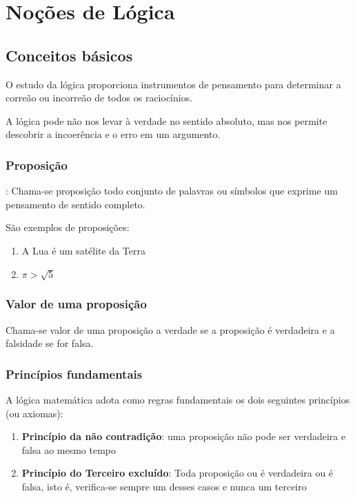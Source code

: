 \chapter{Noções de Lógica}

\section{Conceitos básicos}

\hspace{0,5cm}O estudo da lógica proporciona instrumentos de pensamento para determinar a correão ou incorreão de todos os raciocínios.

A lógica pode não nos levar à verdade no sentido absoluto, mas nos permite descobrir a incoerência e o erro em um argumento.

\subsection{Proposição}

\begin{definicao}[Proposição]: Chama-se proposição todo conjunto de palavras ou símbolos que exprime um pensamento de sentido completo.
\end{definicao}

São exemplos de proposições:
\begin{enumerate}
\item A Lua é um satélite da Terra
\item $\pi>\sqrt{5}$
\end{enumerate}

\subsection{Valor de uma proposição}
\begin{definicao}Chama-se valor de uma proposição a verdade se a proposição é verdadeira e a falsidade se for falsa.\end{definicao}

\subsection{Princípios fundamentais}
A lógica matemática adota como regras fundamentais os dois seguintes princípios (ou axiomas):
\begin{enumerate}
\item \textbf{Princípio da não contradição}: uma proposição não pode ser verdadeira e falsa ao mesmo tempo
\item \textbf{Princípio do Terceiro excluído}: Toda proposição ou é verdadeira ou é falsa, isto é, verifica-se sempre um desses casos e nunca um terceiro
\end{enumerate}
